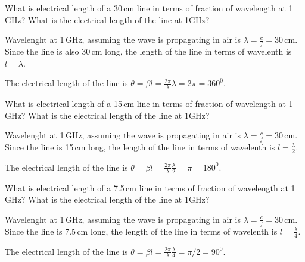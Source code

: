\documentclass{ximera}
\begin{document}
\begin{example}
What is electrical length of a 30\,cm line in terms of fraction of wavelength at 1\,GHz? What is the electrical length of the line at 1GHz?
\begin{explanation}
Wavelenght at 1\,GHz, assuming the wave is propagating in air is $\lambda=\frac{c}{f}=30$\,cm. Since the line is also 30\,cm long, the length of the line in terms of wavelenth is $l=\lambda$.

The electrical length of the line is $\theta=\beta l = \frac{2 \pi}{\lambda} \lambda= 2 \pi = 360^0$.

\end{explanation}

\end{example}


\begin{example}
What is electrical length of a 15\,cm line in terms of fraction of wavelength at 1\,GHz? What is the electrical length of the line at 1GHz?
\begin{explanation}
Wavelenght at 1\,GHz, assuming the wave is propagating in air is $\lambda=\frac{c}{f}=30$\,cm. Since the line is 15\,cm long, the length of the line in terms of wavelenth is $l=\frac{\lambda}{2}$.

The electrical length of the line is $\theta=\beta l = \frac{2 \pi}{\lambda} \frac{\lambda}{2} =  \pi = 180^0$.


\end{explanation}

\end{example}


\begin{example}
What is electrical length of a 7.5\,cm line in terms of fraction of wavelength at 1\,GHz? What is the electrical length of the line at 1GHz?
\begin{explanation}
Wavelenght at 1\,GHz, assuming the wave is propagating in air is $\lambda=\frac{c}{f}=30$\,cm. Since the line is 7.5\,cm long, the length of the line in terms of wavelenth is $l=\frac{\lambda}{4}$.

The electrical length of the line is $\theta=\beta l = \frac{2 \pi}{\lambda} \frac{\lambda}{4} =  \pi/2 = 90^0$.


\end{explanation}

\end{example}
\end{document}

